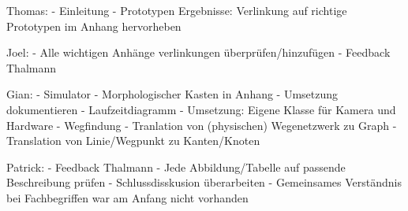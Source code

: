 Thomas:
- Einleitung
- Prototypen Ergebnisse: Verlinkung auf richtige Prototypen im Anhang hervorheben

Joel:
- Alle wichtigen Anhänge verlinkungen überprüfen/hinzufügen
- Feedback Thalmann

Gian:
- Simulator
    - Morphologischer Kasten in Anhang
    - Umsetzung dokumentieren
    - Laufzeitdiagramm
    - Umsetzung: Eigene Klasse für Kamera und Hardware
- Wegfindung
  - Tranlation von (physischen) Wegenetzwerk zu Graph
  - Translation von Linie/Wegpunkt zu Kanten/Knoten


Patrick:
- Feedback Thalmann
- Jede Abbildung/Tabelle auf passende Beschreibung prüfen
- Schlussdisskusion überarbeiten
  - Gemeinsames Verständnis bei Fachbegriffen war am Anfang nicht vorhanden
